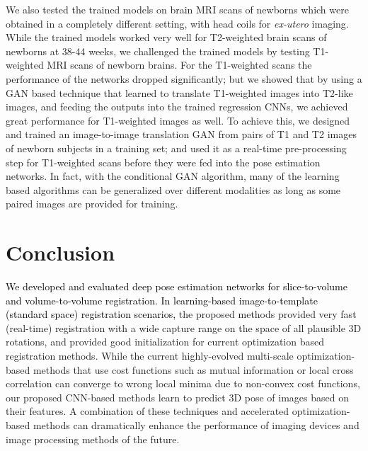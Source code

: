 \documentclass[journal,transmag]{IEEEtran}
\begin{document}
We also tested the trained models on brain MRI scans of newborns which were obtained in a completely different setting, with head coils for \textit{ex-utero} imaging. While the trained models worked very well for T2-weighted brain scans of newborns at 38-44 weeks, we challenged the trained models by testing T1-weighted MRI scans of newborn brains. For the T1-weighted scans the performance of the networks dropped significantly; but we showed that by using a GAN based technique that learned to translate T1-weighted images into T2-like images, and feeding the outputs into the trained regression CNNs, we achieved great performance for T1-weighted images as well. To achieve this, we designed and trained an image-to-image translation GAN from pairs of T1 and T2 images of newborn subjects in a training set; and used it as a real-time pre-processing step for T1-weighted scans before they were fed into the pose estimation networks. In fact, with the conditional GAN algorithm, many of the learning based algorithms can be generalized over different modalities as long as some paired images are provided for training.

\section{Conclusion}
\textcolor{black}{We developed and evaluated deep pose estimation networks for slice-to-volume and volume-to-volume registration. In learning-based image-to-template (standard space) registration scenarios,} the proposed methods provided very fast (real-time) registration with a wide capture range on the space of all plausible 3D rotations, and provided good initialization for current optimization based registration methods. While the current highly-evolved multi-scale optimization-based methods that use cost functions such as mutual information or local cross correlation can converge to wrong local minima due to non-convex cost functions, our proposed CNN-based methods learn to predict 3D pose of images based on their features. A combination of these techniques and accelerated optimization-based methods can dramatically enhance the performance of imaging devices and image processing methods of the future.

\appendices
{}
\section{}
\label{appendix}
\end{document}
